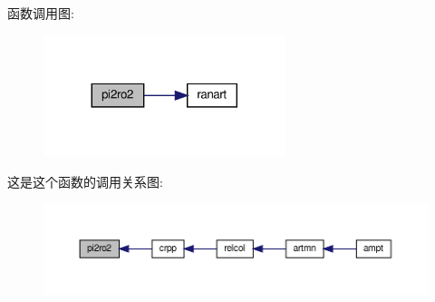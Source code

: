 函数调用图\+:
\nopagebreak
\begin{figure}[H]
\begin{center}
\leavevmode
\includegraphics[width=200pt]{pi2ro2_8f90_a54734b9fb10eb3327271503592dfa464_cgraph}
\end{center}
\end{figure}
这是这个函数的调用关系图\+:
\nopagebreak
\begin{figure}[H]
\begin{center}
\leavevmode
\includegraphics[width=350pt]{pi2ro2_8f90_a54734b9fb10eb3327271503592dfa464_icgraph}
\end{center}
\end{figure}
